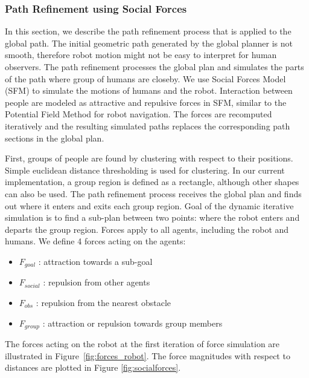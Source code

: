 \subsubsection{Path Refinement using Social Forces}
\label{sec:navigation_path_refinement}

In this section, we describe the path refinement process that is applied to the global path. The initial geometric path generated by the global planner is not smooth, therefore robot motion might not be easy to interpret for human observers. The path refinement processes the global plan and simulates the parts of the path where group of humans are closeby. We use Social Forces Model (SFM) \cite{helbing1995social} to simulate the motions of humans and the robot. Interaction between people are modeled as attractive and repulsive forces in SFM, similar to the Potential Field Method \cite{khatib1986real} for robot navigation. The forces are recomputed iteratively and the resulting simulated paths replaces the corresponding path sections in the global plan.

First, groups of people are found by clustering with respect to their positions. Simple euclidean distance thresholding is used for clustering. In our current implementation, a group region is defined as a rectangle, although other shapes can also be used. The path refinement process receives the global plan and finds out where it enters and exits each group region. Goal of the dynamic iterative simulation is to find a sub-plan between two points: where the robot enters and departs the group region. Forces apply to all agents, including the robot and humans. We define 4 forces acting on the agents:
\begin{itemize}
  \item $F_{goal}$ : attraction towards a sub-goal
  \item $F_{social}$ : repulsion from other agents
  \item $F_{obs}$ : repulsion from the nearest obstacle
  \item $F_{group}$ : attraction or repulsion towards group members
\end{itemize}
The forces acting on the robot at the first iteration of force simulation are illustrated in Figure~\ref{fig:forces_robot}. The force magnitudes with respect to distances are plotted in Figure \ref{fig:socialforces}. 

